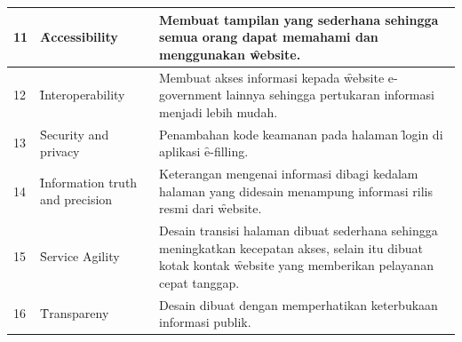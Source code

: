 \begin{center}
\begin{longtable}{|p{0.5cm}|p{4.5cm}|p{6.5cm}|}
		11 & \f{Accessibility} & Membuat tampilan yang sederhana sehingga semua orang dapat memahami dan menggunakan \f{website}. \\ \hline
		12 & \f{Interoperability} & Membuat akses informasi kepada \f{website e-government} lainnya sehingga pertukaran informasi menjadi lebih mudah. \\ \hline
		13 & \f{Security and privacy} & Penambahan kode keamanan pada halaman \f{login} di aplikasi \f{e-filling}. \\ \hline
		14 & \f{Information truth and precision} & Keterangan mengenai informasi dibagi kedalam halaman yang didesain menampung informasi rilis resmi dari \f{website}. \\ \hline
		15 & \f{Service Agility} & Desain transisi halaman dibuat sederhana sehingga meningkatkan kecepatan akses, selain itu dibuat kotak kontak \f{website} yang memberikan pelayanan cepat tanggap. \\ \hline
		16 & \f{Transpareny} & Desain dibuat dengan memperhatikan keterbukaan informasi publik. \\ \hline
	\end{longtable}
\end{center}
